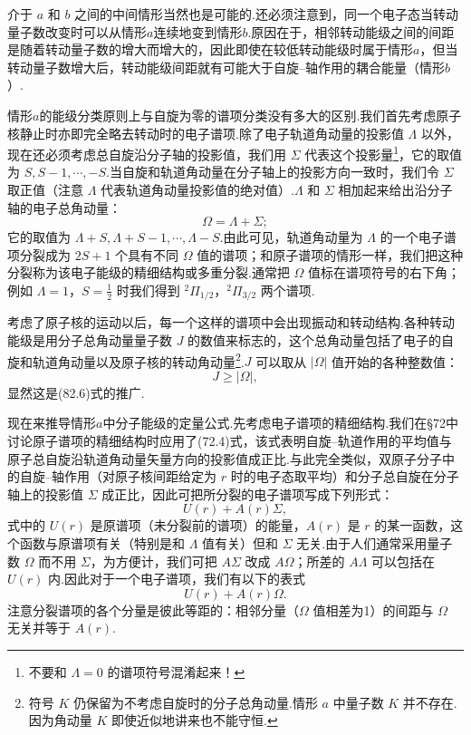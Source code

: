 介于 $a$ 和 $b$ 之间的中间情形当然也是可能的.还必须注意到，同一个电子态当转动量子数改变时可以从情形$a$连续地变到情形$b$.原因在于，相邻转动能级之间的间距是随着转动量子数的增大而增大的，因此即使在较低转动能级时属于情形$a$，但当转动量子数增大后，转动能级间距就有可能大于自旋–轴作用的耦合能量（情形$b$）.

情形$a$的能级分类原则上与自旋为零的谱项分类没有多大的区别.我们首先考虑原子核静止时亦即完全略去转动时的电子谱项.除了电子轨道角动量的投影值 $\Lambda$ 以外，现在还必须考虑总自旋沿分子轴的投影值，我们用 $\Sigma$ 代表这个投影量\footnote{不要和 $\Lambda=0$ 的谱项符号混淆起来！}，它的取值为 $S,S-1,\cdots,-S$.当自旋和轨道角动量在分子轴上的投影方向一致时，我们令 $\Sigma$ 取正值（注意 $\Lambda$ 代表轨道角动量投影值的绝对值）.$\Lambda$ 和 $\Sigma$ 相加起来给出沿分子轴的电子总角动量：
\begin{equation}
  \Omega=\Lambda+\Sigma;
\end{equation}
它的取值为 $\Lambda+S,\Lambda+S-1,\cdots,\Lambda-S$.由此可见，轨道角动量为 $\Lambda$ 的一个电子谱项分裂成为 $2S+1$ 个具有不同 $\Omega$ 值的谱项；和原子谱项的情形一样，我们把这种分裂称为该电子能级的精细结构或多重分裂.通常把 $\Omega$ 值标在谱项符号的右下角；例如 $\Lambda=1$，$S=\frac{1}{2}$ 时我们得到 $^2\Pi_{1/2}$，$^2\Pi_{3/2}$ 两个谱项.

考虑了原子核的运动以后，每一个这样的谱项中会出现振动和转动结构.各种转动能级是用分子总角动量量子数 $J$ 的数值来标志的，这个总角动量包括了电子的自旋和轨道角动量以及原子核的转动角动量\footnote{符号 $K$ 仍保留为不考虑自旋时的分子总角动量.情形 $a$ 中量子数 $K$ 并不存在.因为角动量 $K$ 即使近似地讲来也不能守恒.}.$J$ 可以取从 $|\Omega|$ 值开始的各种整数值：
\begin{equation}
  J\geqslant|\Omega|,
\end{equation}
显然这是(82.6)式的推广.

现在来推导情形$a$中分子能级的定量公式.先考虑电子谱项的精细结构.我们在§72中讨论原子谱项的精细结构时应用了(72.4)式，该式表明自旋–轨道作用的平均值与原子总自旋沿轨道角动量矢量方向的投影值成正比.与此完全类似，双原子分子中的自旋–轴作用（对原子核间距给定为 $r$ 时的电子态取平均）和分子总自旋在分子轴上的投影值 $\Sigma$ 成正比，因此可把所分裂的电子谱项写成下列形式：
\begin{equation*}
  U(r)+A(r)\Sigma,
\end{equation*}
式中的 $U(r)$ 是原谱项（未分裂前的谱项）的能量，$A(r)$ 是 $r$ 的某一函数，这个函数与原谱项有关（特别是和 $\Lambda$ 值有关）但和 $\Sigma$ 无关.由于人们通常采用量子数 $\Omega$ 而不用 $\Sigma$，为方便计，我们可把 $A\Sigma$ 改成 $A\Omega$；所差的 $A\Lambda$ 可以包括在 $U(r)$ 内.因此对于一个电子谱项，我们有以下的表式
\begin{equation}
  U(r)+A(r)\Omega.
\end{equation}
注意分裂谱项的各个分量是彼此等距的：相邻分量（$\Omega$ 值相差为1）的间距与 $\Omega$ 无关并等于 $A(r)$.

